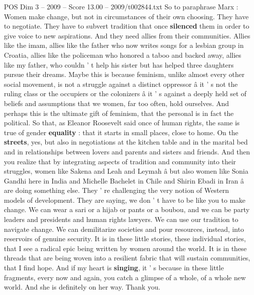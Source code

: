 \begin{textsample}{POS Dim 3 – 2009 – Score 13.00 – 2009/t002844.txt}
So to paraphrase Marx : Women make change, but not in circumstances of their own choosing.
They have to negotiate.
They have to subvert tradition that once \textbf{silenced} them in order to give voice to new aspirations.
And they need allies from their communities.
Allies like the imam, allies like the father who now writes songs for a lesbian group in Croatia, allies like the policeman who honored a taboo and backed away, allies like my father, who couldn ' t help his sister but has helped three daughters pursue their dreams.
Maybe this is because feminism, unlike almost every other social movement, is not a struggle against a distinct oppressor â it ' s not the ruling class or the occupiers or the colonizers â it ' s against a deeply held set of beliefs and assumptions that we women, far too often, hold ourselves.
And perhaps this is the ultimate gift of feminism, that the personal is in fact the political.
So that, as Eleanor Roosevelt said once of human rights, the same is true of gender \textbf{equality} : that it starts in small places, close to home.
On the \textbf{streets}, yes, but also in negotiations at the kitchen table and in the marital bed and in relationships between lovers and parents and sisters and friends.
And then you realize that by integrating aspects of tradition and community into their struggles, women like Sakena and Leah and Leymah â but also women like Sonia Gandhi here in India and Michelle Bachelet in Chile and Shirin Ebadi in Iran â are doing something else.
They ' re challenging the very notion of Western models of development.
They are saying, we don ' t have to be like you to make change.
We can wear a sari or a hijab or pants or a boubou, and we can be party leaders and presidents and human rights lawyers.
We can use our tradition to navigate change.
We can demilitarize societies and pour resources, instead, into reservoirs of genuine security.
It is in these little stories, these individual stories, that I see a radical epic being written by women around the world.
It is in these threads that are being woven into a resilient fabric that will sustain communities, that I find hope.
And if my heart is \textbf{singing}, it ' s because in these little fragments, every now and again, you catch a glimpse of a whole, of a whole new world.
And she is definitely on her way.
Thank you.

\end{textsample}
